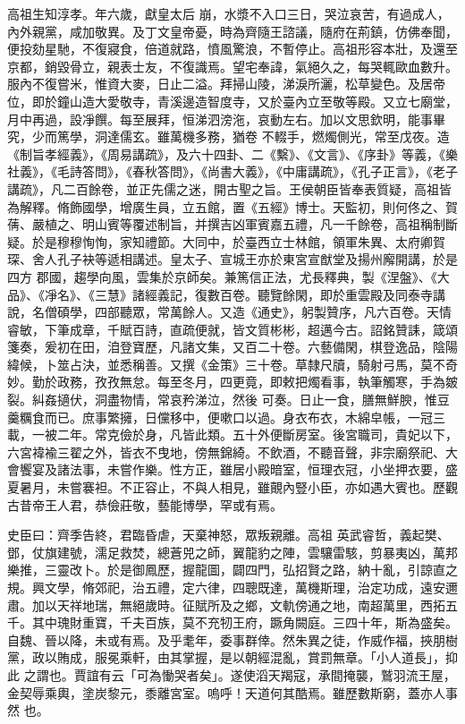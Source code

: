 \begin{pinyinscope}
 高祖生知淳孝。年六歲，獻皇太后
 崩，水漿不入口三日，哭泣哀苦，有過成人，內外親黨，咸加敬異。及丁文皇帝憂，時為齊隨王諮議，隨府在荊鎮，仿佛奉聞，便投劾星馳，不復寢食，倍道就路，憤風驚浪，不暫停止。高祖形容本壯，及還至京都，銷毀骨立，親表士友，不復識焉。望宅奉諱，氣絕久之，每哭輒歐血數升。服內不復嘗米，惟資大麥，日止二溢。拜掃山陵，涕淚所灑，松草變色。及居帝位，即於鐘山造大愛敬寺，青溪邊造智度寺，又於臺內立至敬等殿。又立七廟堂，月中再過，設凈饌。每至展拜，恒涕泗滂沲，哀動左右。加以文思欽明，能事畢究，少而篤學，洞達儒玄。雖萬機多務，猶卷
 不輟手，燃燭側光，常至戊夜。造《制旨孝經義》，《周易講疏》，及六十四卦、二《繫》、《文言》、《序卦》等義，《樂社義》，《毛詩答問》，《春秋答問》，《尚書大義》，《中庸講疏》，《孔子正言》，《老子講疏》，凡二百餘卷，並正先儒之迷，開古聖之旨。王侯朝臣皆奉表質疑，高祖皆為解釋。脩飾國學，增廣生員，立五館，置《五經》博士。天監初，則何佟之、賀蒨、嚴植之、明山賓等覆述制旨，并撰吉凶軍賓嘉五禮，凡一千餘卷，高祖稱制斷疑。於是穆穆恂恂，家知禮節。大同中，於臺西立士林館，領軍朱異、太府卿賀琛、舍人孔子袂等遞相講述。皇太子、宣城王亦於東宮宣猷堂及揚州廨開講，於是四方
 郡國，趨學向風，雲集於京師矣。兼篤信正法，尤長釋典，製《涅盤》、《大品》、《凈名》、《三慧》諸經義記，復數百卷。聽覽餘閑，即於重雲殿及同泰寺講說，名僧碩學，四部聽眾，常萬餘人。又造《通史》，躬製贊序，凡六百卷。天情睿敏，下筆成章，千賦百詩，直疏便就，皆文質彬彬，超邁今古。詔銘贊誄，箴頌箋奏，爰初在田，洎登寶歷，凡諸文集，又百二十卷。六藝備閑，棋登逸品，陰陽緯候，卜筮占決，並悉稱善。又撰《金策》三十卷。草隸尺牘，騎射弓馬，莫不奇妙。勤於政務，孜孜無怠。每至冬月，四更竟，即敕把燭看事，執筆觸寒，手為皴裂。糾姦擿伏，洞盡物情，常哀矜涕泣，然後
 可奏。日止一食，膳無鮮腴，惟豆羹糲食而已。庶事繁擁，日儻移中，便嗽口以過。身衣布衣，木綿皁帳，一冠三載，一被二年。常克儉於身，凡皆此類。五十外便斷房室。後宮職司，貴妃以下，六宮褘褕三翟之外，皆衣不曳地，傍無錦綺。不飲酒，不聽音聲，非宗廟祭祀、大會饗宴及諸法事，未嘗作樂。性方正，雖居小殿暗室，恒理衣冠，小坐押衣要，盛夏暑月，未嘗褰袒。不正容止，不與人相見，雖覿內豎小臣，亦如遇大賓也。歷觀古昔帝王人君，恭儉莊敬，藝能博學，罕或有焉。



 史臣曰：齊季告終，君臨昏虐，天棄神怒，眾叛親離。高祖
 英武睿哲，義起樊、鄧，仗旗建號，濡足救焚，總蒼兕之師，翼龍豹之陣，雲驤雷駭，剪暴夷凶，萬邦樂推，三靈改卜。於是御鳳歷，握龍圖，闢四門，弘招賢之路，納十亂，引諒直之規。興文學，脩郊祀，治五禮，定六律，四聰既達，萬機斯理，治定功成，遠安邇肅。加以天祥地瑞，無絕歲時。征賦所及之鄉，文軌傍通之地，南超萬里，西拓五千。其中瑰財重寶，千夫百族，莫不充牣王府，蹶角闕庭。三四十年，斯為盛矣。自魏、晉以降，未或有焉。及乎耄年，委事群倖。然朱異之徒，作威作福，挾朋樹黨，政以賄成，服冕乘軒，由其掌握，是以朝經混亂，賞罰無章。「小人道長」，抑此
 之謂也。賈誼有云「可為慟哭者矣」。遂使滔天羯寇，承間掩襲，鷲羽流王屋，金契辱乘輿，塗炭黎元，黍離宮室。嗚呼！天道何其酷焉。雖歷數斯窮，蓋亦人事然
 也。



\end{pinyinscope}